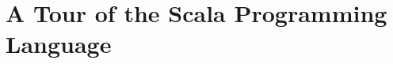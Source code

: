 \documentclass[a4paper,12pt,twoside,titlepage]{book}
\newcommand{\langname}[1]{#1{}}
\newcommand{\Scala}{\langname{Scala}}
\begin{document}
\frontmatter
\makedoctitle
\clearemptydoublepage
\tableofcontents
\mainmatter


\setcounter{secnumdepth}{-1}

\section{A Tour of the \Scala{} Programming Language}


\end{document}
